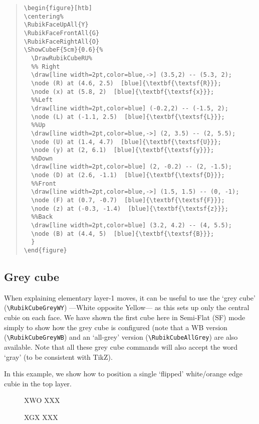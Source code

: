 \documentclass[a4paper]{article}
\newcommand{\cubenumber}[1]{\strut\raisebox{1cm}{#1}}
\begin{document}
\begin{quote}
\begin{verbatim}
\begin{figure}[htb]
\centering%
\RubikFaceUpAll{Y}
\RubikFaceFrontAll{G}
\RubikFaceRightAll{O}
\ShowCubeF{5cm}{0.6}{%
  \DrawRubikCubeRU%
  %% Right
  \draw[line width=2pt,color=blue,->] (3.5,2) -- (5.3, 2);
  \node (R) at (4.6, 2.5)  [blue]{\textbf{\textsf{R}}};
  \node (x) at (5.8, 2)  [blue]{\textbf{\textsf{x}}};
  %%Left
  \draw[line width=2pt,color=blue] (-0.2,2) -- (-1.5, 2);
  \node (L) at (-1.1, 2.5)  [blue]{\textbf{\textsf{L}}};
  %%Up
  \draw[line width=2pt,color=blue,->] (2, 3.5) -- (2, 5.5);
  \node (U) at (1.4, 4.7)  [blue]{\textbf{\textsf{U}}};
  \node (y) at (2, 6.1)  [blue]{\textbf{\textsf{y}}};
  %%Down
  \draw[line width=2pt,color=blue] (2, -0.2) -- (2, -1.5);
  \node (D) at (2.6, -1.1)  [blue]{\textbf{\textsf{D}}};
  %%Front
  \draw[line width=2pt,color=blue,->] (1.5, 1.5) -- (0, -1);
  \node (F) at (0.7, -0.7)  [blue]{\textbf{\textsf{F}}};
  \node (z) at (-0.3, -1.4)  [blue]{\textbf{\textsf{z}}};
  %%Back
  \draw[line width=2pt,color=blue] (3.2, 4.2) -- (4, 5.5);
  \node (B) at (4.4, 5)  [blue]{\textbf{\textsf{B}}};
  }
\end{figure} 
\end{verbatim}
\end{quote}


\pagebreak

\subsection{Grey cube}
\label{sec:greycube}

When explaining elementary layer-1 moves, it can be useful to use the `grey cube' 
(\verb!\RubikCubeGreyWY!) ---White opposite Yellow--- as this  sets up only 
the central cubie on each face. 
We have shown the first cube here in Semi-Flat (SF) mode simply to show  how the grey 
cube is configured  (note that  a WB version (\verb!\RubikCubeGreyWB!) 
and an `all-grey' version (\verb!\RubikCubeAllGrey!)  are also available. 
Note that all these grey cube commands will also  accept 
the word `gray' (to be consistent with TikZ).

In this  example, we show how to position a single  `flipped'  white/orange edge 
cubie in the top  layer. 
  
\begin{figure}[hbt]

\centering%
\RubikCubeGreyWY%

%
            {X}{W}{O}%
            {X}{X}{X}%
               
               {X}{G}{X}
               {X}{X}{X}
%
\cubenumber{1}%
%
\quad{}
\cubenumber{2}%
%
\quad{}
\cubenumber{3}%
%
\end{figure}
\end{document}
